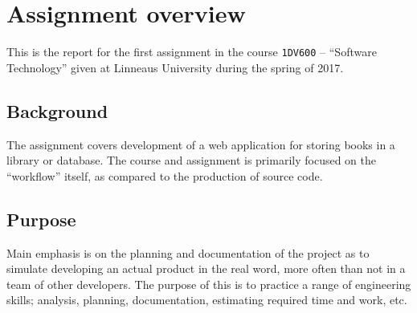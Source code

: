%
%
%
%


\section{Assignment overview}
This is the report for the first assignment in the course \texttt{1DV600} --
``Software Technology'' given at Linneaus University during the spring of 2017.


\subsection{Background}
The assignment covers development of a web application for storing books in a
library or database. The course and assignment is primarily focused on the
``workflow'' itself, as compared to the production of source code.


\subsection{Purpose}
Main emphasis is on the planning and documentation of the project as to
simulate developing an actual product in the real word, more often than not in
a team of other developers.
The purpose of this is to practice a range of engineering skills; analysis,
planning, documentation, estimating required time and work, etc.

